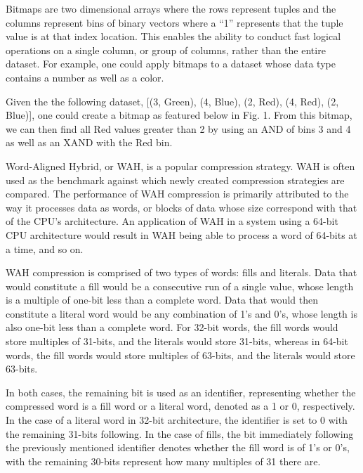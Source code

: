 \documentclass{article}
\begin{document}
Bitmaps are two dimensional arrays where the rows represent tuples and the columns represent bins of binary vectors where a “1” represents that the tuple value is at that index location. This enables the ability to conduct fast logical operations on a single column, or group of columns, rather than the entire dataset. For example, one could apply bitmaps to a dataset whose data type contains a number as well as a color. \par

Given the the following dataset, [(3, Green), (4, Blue), (2, Red), (4, Red), (2, Blue)], one could create a bitmap as featured below in Fig. 1. From this bitmap, we can then find all Red values greater than 2 by using an AND of bins 3 and 4 as well as an XAND with the Red bin. \par


Word-Aligned Hybrid, or WAH, is a popular compression strategy. WAH is often used as the benchmark against which newly created compression strategies are compared. The performance of WAH compression is primarily attributed to the way it processes data as words, or blocks of data whose size correspond with that of the CPU's architecture. An application of WAH in a system using a 64-bit CPU architecture would result in WAH being able to process a word of 64-bits at a time, and so on.
\par 
WAH compression is comprised of two types of words: fills and literals. Data that would constitute a fill would be a consecutive run of a single value, whose length is a multiple of one-bit less than a complete word. Data that would then constitute a literal word would be any combination of 1's and 0's, whose length is also one-bit less than a complete word. For 32-bit words, the fill words would store multiples of 31-bits, and the literals would store 31-bits, whereas in 64-bit words, the fill words would store multiples of 63-bits, and the literals would store 63-bits. 
\par 
In both cases, the remaining bit is used as an identifier, representing whether the compressed word is a fill word or a literal word, denoted as a 1 or 0, respectively. In the case of a literal word in 32-bit architecture, the identifier is set to 0 with the remaining 31-bits following. In the case of fills, the bit immediately following the previously mentioned identifier denotes whether the fill word is of 1’s or 0’s, with the remaining 30-bits represent how many multiples of 31 there are. \par
\end{document}
